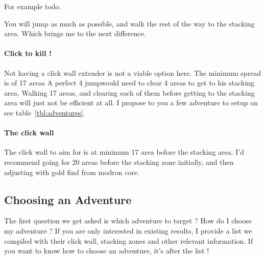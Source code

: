 \documentclass{article}
\begin{document}
For example todo.

You will jump as much as possible, and walk the rest of the way to the stacking area.
Which brings me to the next difference.

\paragraph{Click to kill !}
Not having a click wall extender is not a viable option here. 
The minimum spread is of 17 areas 
A perfect 4 jump\briv would need to clear 4 areas to get to his stacking area.
Walking 17 areas, and clearing each of them before getting to the stacking area will just not be efficient at all.
I propose to you a few adventure to setup on see table~\ref{tbl:adventures}.

\paragraph{The click wall}
The click wall to aim for is at minimum 17 area before the stacking area.
I'd recommend going for 20 areas before the stacking zone initially, and then adjusting with gold find from modron core.

\subsection{Choosing an Adventure}

The first question we get asked is which adventure to target ?
How do I choose my adventure ?
If you are only interested in existing results, I provide a list we compiled with their click wall, stacking zones and other relevant information.
If you want to know how to choose an adventure, it's after the list !
\end{document}

